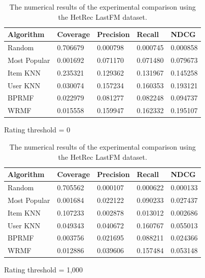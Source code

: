 \begin{table}
\begin{subfigure}{\textwidth}
\centering
\begin{tabular}{@{}lllll@{}}
\toprule
Algorithm & Coverage & Precision & Recall & NDCG \\ \midrule
Random & 0.706679 & 0.000798 & 0.000745 & 0.000858 \\
Most Popular & 0.001692 & 0.071170 & 0.071480 & 0.079673 \\
Item KNN & 0.235321 & 0.129362 & 0.131967 & 0.145258 \\
User KNN & 0.030074 & 0.157234 & 0.160353 & 0.193121 \\
BPRMF & 0.022979 & 0.081277 & 0.082248 & 0.094737 \\
WRMF & 0.015558 & 0.159947 & 0.162332 & 0.195107 \\ \bottomrule
\end{tabular}
\caption{Rating threshold = 0}
\bigskip
\end{subfigure}
\begin{subfigure}{\textwidth}
\centering
\begin{tabular}{@{}lllll@{}}
\toprule
Algorithm & Coverage & Precision & Recall & NDCG \\ \midrule
Random & 0.705562 & 0.000107 & 0.000622 & 0.000133 \\
Most Popular & 0.001684 & 0.022122 & 0.090233 & 0.027437 \\
Item KNN & 0.107233 & 0.002878 & 0.013012 & 0.002686 \\
User KNN & 0.049343 & 0.040672 & 0.160767 & 0.055013 \\
BPRMF & 0.003756 & 0.021695 & 0.088211 & 0.024366 \\
WRMF & 0.012886 & 0.039606 & 0.157484 & 0.053148 \\ \bottomrule
\end{tabular}
\caption{Rating threshold = 1,000}
\end{subfigure}
\caption[Experimental comparison with LastFM]{The numerical results of the experimental comparison using the HetRec LastFM dataset.}
\label{viz:tab:experiment}
\end{table}


